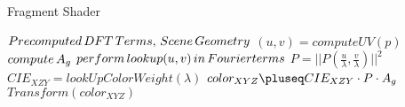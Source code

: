 \begin{algorithm}[H]
  \caption{Fragment Shader}
  \begin{algorithmic}
    \INPUT $Precomputed \thinspace DFT \thinspace Terms,\thinspace Scene \thinspace Geometry$
      \State $ (u,v) = computeUV(p) $
      \State $ compute \thinspace A_g $
      \ForAll{$\lambda \in [380nm, 780nm]$}
        \State $ perform \thinspace  lookup(u,v) \thinspace in \thinspace Fourierterms $  
        \State $ P = || P(\frac{u}{\lambda}, \frac{v}{\lambda}) || ^2$
        \State $ CIE_{XZY} = lookUpColorWeight(\lambda)$
        \State $ color_{XYZ} \pluseq CIE_{XZY} \cdot P \cdot A_g $
      \EndFor
      \OUTPUT $ Transform(color_{XYZ}) $
    \EndFor
  \end{algorithmic}
\label{alg:fragmentshadershort}
\end{algorithm}